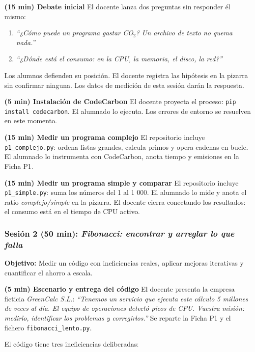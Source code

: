 \textbf{(15 min) Debate inicial} El docente lanza dos preguntas sin responder él mismo:

\begin{enumerate}
\item \textit{``¿Cómo puede un programa gastar CO$_2$? Un archivo de texto no quema nada.''}
\item \textit{``¿Dónde está el consumo: en la CPU, la memoria, el disco, la red?''}
\end{enumerate}


Los alumnos defienden su posición. El docente registra las hipótesis en la pizarra sin confirmar ninguna. Los datos de medición de esta sesión darán la respuesta.


\textbf{(5 min) Instalación de CodeCarbon} El docente proyecta el proceso: \texttt{pip install codecarbon}. El alumnado lo ejecuta. Los errores de entorno se resuelven en este momento.


\textbf{(15 min) Medir un programa complejo} El repositorio incluye \texttt{p1\_complejo.py}: ordena listas grandes, calcula primos y opera cadenas en bucle. El alumnado lo instrumenta con CodeCarbon, anota tiempo y emisiones en la Ficha P1.


\textbf{(15 min) Medir un programa simple y comparar} El repositorio incluye \texttt{p1\_simple.py}: suma los números del 1 al 1 000. El alumnado lo mide y anota el ratio \textit{complejo/simple} en la pizarra. El docente cierra conectando los resultados: el consumo está en el tiempo de CPU activo.




\subsubsection{Sesión 2 (50 min): \textit{Fibonacci: encontrar y arreglar lo que falla}}


\textbf{Objetivo:} Medir un código con ineficiencias reales, aplicar mejoras iterativas y cuantificar el ahorro a escala.


\textbf{(5 min) Escenario y entrega del código} El docente presenta la empresa ficticia \textit{GreenCalc S.L.}: \textit{``Tenemos un servicio que ejecuta este cálculo 5 millones de veces al día. El equipo de operaciones detectó picos de CPU. Vuestra misión: medirlo, identificar los problemas y corregirlos.''} Se reparte la Ficha P1 y el fichero \texttt{fibonacci\_lento.py}.


El código tiene tres ineficiencias deliberadas:


